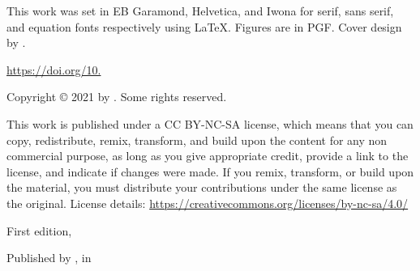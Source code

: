 
{\small
\noindent This work was set in EB Garamond, Helvetica, and Iwona for serif, sans serif, and equation fonts respectively using \LaTeX. Figures are in PGF. Cover design by \authorname.
\setlength{\parindent}{0em}\setlength{\parskip}{1em}
~

\vfill

\url{https://doi.org/10.}

Copyright \copyright{} 2021 by \authorname. Some rights reserved.

This work is published under a CC BY-NC-SA license, which means that you can copy, redistribute, remix, transform, and build upon the content for any non commercial purpose, as long as you give appropriate credit, provide a link to the license, and indicate if changes were made. If you remix, transform, or build upon the material, you must distribute your contributions under the same license as the original. License details: \url{https://creativecommons.org/licenses/by-nc-sa/4.0/}

First edition, \editionyear{}


Published by \publisher{}, in \place{}
}\cleardoublepage
